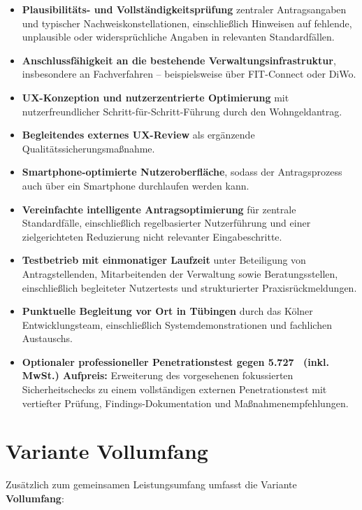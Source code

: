 \documentclass[11pt,a4paper,openany]{report}
\begin{document}
\begin{itemize}
  \item \textbf{Plausibilitäts- und Vollständigkeitsprüfung} zentraler Antragsangaben und typischer Nachweiskonstellationen, einschließlich Hinweisen auf fehlende, unplausible oder widersprüchliche Angaben in relevanten Standardfällen.
  \item \textbf{Anschlussfähigkeit an die bestehende Verwaltungsinfrastruktur}, insbesondere an Fachverfahren -- beispielsweise über FIT-Connect oder DiWo.
  \item \textbf{UX-Konzeption und nutzerzentrierte Optimierung} mit nutzerfreundlicher Schritt-für-Schritt-Führung durch den Wohngeldantrag.
  \item \textbf{Begleitendes externes UX-Review} als ergänzende Qualitätssicherungsmaßnahme.
  \item \textbf{Smartphone-optimierte Nutzeroberfläche}, sodass der Antragsprozess auch über ein Smartphone durchlaufen werden kann.
  \item \textbf{Vereinfachte intelligente Antragsoptimierung} für zentrale Standardfälle, einschließlich regelbasierter Nutzerführung und einer zielgerichteten Reduzierung nicht relevanter Eingabeschritte.
  \item \textbf{Testbetrieb mit einmonatiger Laufzeit} unter Beteiligung von Antragstellenden, Mitarbeitenden der Verwaltung sowie Beratungsstellen, einschließlich begleiteter Nutzertests und strukturierter Praxisrückmeldungen.
  \item \textbf{Punktuelle Begleitung vor Ort in Tübingen} durch das Kölner Entwicklungsteam, einschließlich Systemdemonstrationen und fachlichen Austauschs.
  \item \textbf{Optionaler professioneller Penetrationstest gegen 5.727~\texteuro{} (inkl.\,MwSt.) Aufpreis:} Erweiterung des vorgesehenen fokussierten Sicherheitschecks zu einem vollständigen externen Penetrationstest mit vertiefter Prüfung, Findings-Dokumentation und Maßnahmenempfehlungen.
\end{itemize}

\newpage
\section{Variante \textbf{Vollumfang}}

Zusätzlich zum gemeinsamen Leistungsumfang umfasst die Variante \textbf{Vollumfang}:
\end{document}
